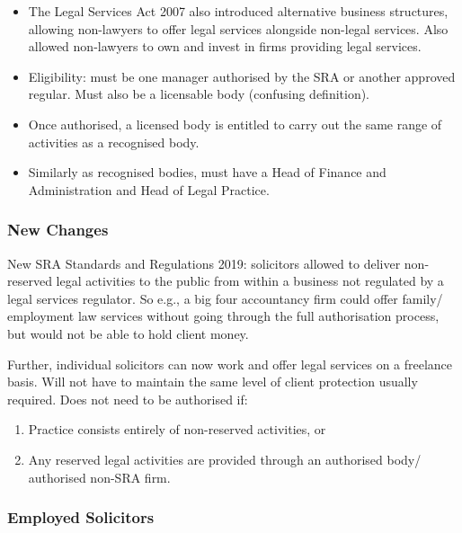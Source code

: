 \documentclass[
]{article}
\providecommand{\tightlist}{%
  \setlength{\itemsep}{0pt}\setlength{\parskip}{0pt}}
\begin{document}
\begin{itemize}
  \begin{itemize}
  \tightlist
  \item
    The Legal Services Act 2007 also introduced alternative business
    structures, allowing non-lawyers to offer legal services alongside
    non-legal services. Also allowed non-lawyers to own and invest in
    firms providing legal services.
  \item
    Eligibility: must be one manager authorised by the SRA or another
    approved regular. Must also be a licensable body (confusing
    definition).
  \item
    Once authorised, a licensed body is entitled to carry out the same
    range of activities as a recognised body.
  \item
    Similarly as recognised bodies, must have a Head of Finance and
    Administration and Head of Legal Practice.
  \end{itemize}
\end{itemize}

\hypertarget{new-changes}{%
\subsubsection{New Changes}\label{new-changes}}

New SRA Standards and Regulations 2019: solicitors allowed to deliver
non-reserved legal activities to the public from within a business not
regulated by a legal services regulator. So e.g., a big four accountancy
firm could offer family/ employment law services without going through
the full authorisation process, but would not be able to hold client
money.

Further, individual solicitors can now work and offer legal services on
a freelance basis. Will not have to maintain the same level of client
protection usually required. Does not need to be authorised if:

\begin{enumerate}
\tightlist
\item
  Practice consists entirely of non-reserved activities, or
\item
  Any reserved legal activities are provided through an authorised body/
  authorised non-SRA firm.
\end{enumerate}

\hypertarget{employed-solicitors}{%
\subsubsection{Employed Solicitors}\label{employed-solicitors}}
\end{document}
